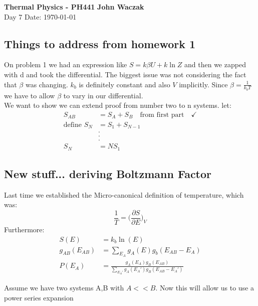 \documentclass[a4paper, 11pt]{article}
\begin{document}
\noindent
\large\textbf{Thermal Physics - PH441} \hfill \textbf{John Waczak} \\
\normalsize Day 7 \hfill  Date: \today \\

\subsection*{Things to address from homework 1} 
On problem 1 we had an expression like $S = k\beta U + k\ln Z$ and then we zapped with d and took the differential. The biggest issue was not considering the fact that $\beta$ was changing. $k_b$ is definitely constant and also $V$ implicitly. Since $\beta = \frac{1}{k_b T}$ we have to allow $\beta$ to vary in our differential. \\ 

\noindent We want to show we can extend proof from number two to n systems. let: 
	\begin{align*}
		S_{AB} &= S_A + S_B \quad \text{from first part} \quad \checkmark\\ 
		\text{define } S_N &= S_1 + S_{N-1} \\ 
		&. \\
		&. \\
		&. \\
		S_N &= NS_1 
	\end{align*}

\subsection*{New stuff... deriving Boltzmann Factor} 
Last time we established the Micro-canonical definition of temperature, which was:
	\begin{equation}
		\frac{1}{T} = \Big(\frac{\partial S}{\partial E}\Big)_V
	\end{equation}
Furthermore: 
	\begin{align*}
		S(E) &= k_b \ln(E) \\ 
		g_{AB}(E_{AB}) &= \sum\limits_{E_A}g_A(E)g_b(E_{AB}-E_A) \\ 
		P(E_A) &= \frac{g_A(E_A)g_B(E_{AB})}{\sum\limits_{E_A'}g_A(E_A')g_B(E_{AB}-E_A')}
	\end{align*}
	
	
\noindent Assume we have two systems A,B with $A<<B$. Now this will allow us to use a power series expansion 
\end{document}
